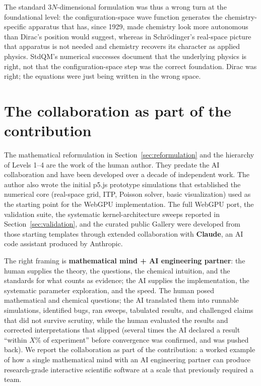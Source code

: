 \documentclass[11pt]{article}
\begin{document}
The standard $3N$-dimensional formulation was thus a wrong turn at the foundational level: the configuration-space wave function generates the chemistry-specific apparatus that has, since 1929, made chemistry look more autonomous than Dirac's position would suggest, whereas in Schr\"odinger's real-space picture that apparatus is not needed and chemistry recovers its character as applied physics. StdQM's numerical successes document that the underlying physics is right, not that the configuration-space step was the correct foundation. Dirac was right; the equations were just being written in the wrong space.


\section{The collaboration as part of the contribution}\label{sec:collaboration}

The mathematical reformulation in Section~\ref{sec:reformulation} and the hierarchy of Levels 1--4 are the work of the human author. They predate the AI collaboration and have been developed over a decade of independent work. The author also wrote the initial p5.js prototype simulations that established the numerical core (real-space grid, ITP, Poisson solver, basic visualization) used as the starting point for the WebGPU implementation. The full WebGPU port, the validation suite, the systematic kernel-architecture sweeps reported in Section~\ref{sec:validation}, and the curated public Gallery were developed from those starting templates through extended collaboration with \textbf{Claude}, an AI code assistant produced by Anthropic.

The right framing is \textbf{mathematical mind + AI engineering partner}: the human supplies the theory, the questions, the chemical intuition, and the standards for what counts as evidence; the AI supplies the implementation, the systematic parameter exploration, and the speed. The human posed mathematical and chemical questions; the AI translated them into runnable simulations, identified bugs, ran sweeps, tabulated results, and challenged claims that did not survive scrutiny, while the human evaluated the results and corrected interpretations that slipped (several times the AI declared a result ``within $X\%$ of experiment'' before convergence was confirmed, and was pushed back). We report the collaboration as part of the contribution: a worked example of how a single mathematical mind with an AI engineering partner can produce research-grade interactive scientific software at a scale that previously required a team.
\end{document}
